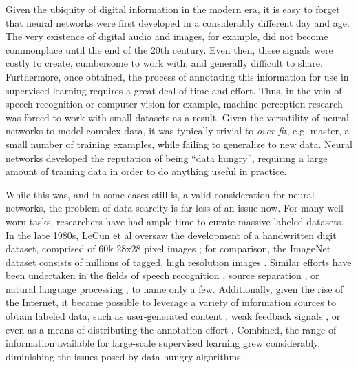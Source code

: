 Given the ubiquity of digital information in the modern era, it is easy to forget that neural networks were first developed in a considerably different day and age.
The very existence of digital audio and images, for example, did not become commonplace until the end of the 20th century.
Even then, these signals were costly to create, cumbersome to work with, and generally difficult to share.
Furthermore, once obtained, the process of annotating this information for use in supervised learning requires a great deal of time and effort.
Thus, in the vein of speech recognition or computer vision for example, machine perception research was forced to work with small datasets as a result.
Given the versatility of neural networks to model complex data, it was typically trivial to \emph{over-fit}, e.g. master, a small number of training examples, while failing to generalize to new data.
Neural networks developed the reputation of being ``data hungry'', requiring a large amount of training data in order to do anything useful in practice.

While this was, and in some cases still is, a valid consideration for neural networks, the problem of data scarcity is far less of an issue now.
For many well worn tasks, researchers have had ample time to curate massive labeled datasets.
In the late 1980s, LeCun et al oversaw the development of a handwritten digit dataset, comprised of 60k 28x28 pixel images \cite{};
for comparison, the ImageNet dataset consists of millions of tagged, high resolution images \cite{}.
Similar efforts have been undertaken in the fields of speech recognition \cite{TIMIT}, source separation \cite{charm, MedleyDB}, or natural language processing \cite{WallStreet, Wikipedia}, to name only a few.
Additionally, given the rise of the Internet, it became possible to leverage a variety of information sources to obtain labeled data, such as user-generated content \cite{last.fm}, weak feedback signals \cite{netflix}, or even as a means of distributing the annotation effort \cite{Captcha, CitizenScience}.
Combined, the range of information available for large-scale supervised learning grew considerably, diminishing the issues posed by data-hungry algorithms.


